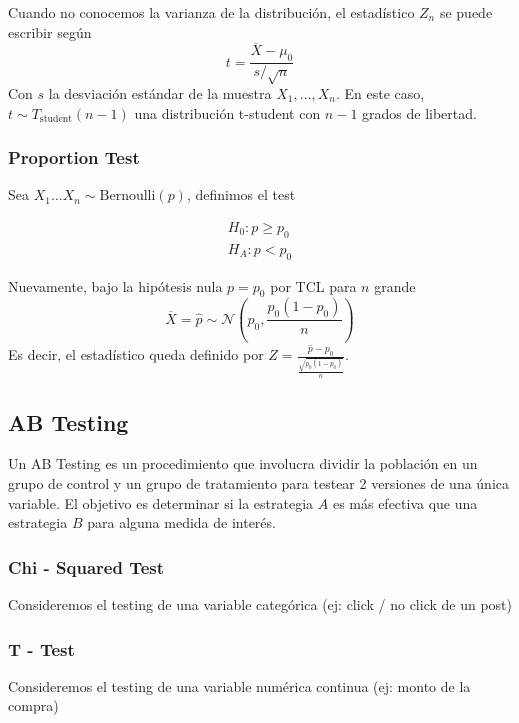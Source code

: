 Cuando no conocemos la varianza de la distribución, el estadístico $Z_n$ se puede escribir según 
$$ 
t = \frac{\overline{X} - \mu_0}{s / \sqrt{n}}
$$
Con $s$ la desviación estándar de la muestra $X_1 , \dots, X_n$. En este caso, $t \sim T_{\text{student}}(n-1)$ una distribución t-student con $n-1$ grados de libertad. 

\subsubsection{Proportion Test}

Sea $X_1 \dots X_n \sim \text{Bernoulli}(p)$, definimos el test 

\begin{equation*}
\begin{aligned}
    H_0: p \geq p_0 \\ 
    H_A: p < p_0
\end{aligned}
\end{equation*}

Nuevamente, bajo la hipótesis nula $p = p_0$ por TCL para $n$ grande
$$ 
\overline{X} = \hat{p} \sim \mathcal{N} \left ( p_0 , \frac{p_0(1-p_0)}{n} \right )
$$
Es decir, el estadístico queda definido por $Z = \frac{\hat{p} - p_0}{\frac{\sqrt{p_0(1-p_0)}}{n}}$. 

\subsection{AB Testing}

Un AB Testing es un procedimiento que involucra dividir la población en un grupo de control y un grupo de tratamiento para testear 2 versiones de una única variable. El objetivo es determinar si la estrategia $A$ es más efectiva que una estrategia $B$ para alguna medida de interés.

\subsubsection{Chi - Squared Test}

Consideremos el testing de una variable categórica (ej: click / no click de un post) 

\subsubsection{T - Test}

Consideremos el testing de una variable numérica continua (ej: monto de la compra)  

